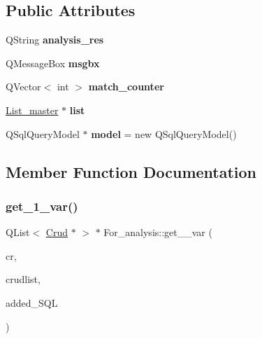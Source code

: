 \subsection*{Public Attributes}
\begin{DoxyCompactItemize}
\item 
\mbox{\label{class_for__analysis_a251957118880cf0a2da445c9b1b586e3}} 
Q\+String {\bfseries analysis\+\_\+res}
\item 
\mbox{\label{class_for__analysis_ad6c36fe176e7d0d0079389ae6e3615dd}} 
Q\+Message\+Box {\bfseries msgbx}
\item 
\mbox{\label{class_for__analysis_a4a22da8f47d58271e22b48810c03f26a}} 
Q\+Vector$<$ int $>$ {\bfseries match\+\_\+counter}
\item 
\mbox{\label{class_for__analysis_a440d3d6448090ff8959d7ed6d9183fc9}} 
\mbox{\hyperlink{class_list__master}{List\+\_\+master}} $\ast$ {\bfseries list}
\item 
\mbox{\label{class_for__analysis_a9967886f57b793af4a15ce2408813014}} 
Q\+Sql\+Query\+Model $\ast$ {\bfseries model} = new Q\+Sql\+Query\+Model()
\end{DoxyCompactItemize}


\subsection{Member Function Documentation}
\mbox{\label{class_for__analysis_a6cad406961034ae0ea3d87f42eef3ddd}} 
\subsubsection{\texorpdfstring{get\_1\_var()}{get\_1\_var()}}
{\footnotesize\ttfamily Q\+List$<$ \mbox{\hyperlink{class_crud}{Crud}} $\ast$ $>$ $\ast$ For\+\_\+analysis\+::get\+\_\+\_\+var (\begin{DoxyParamCaption}\item[{\mbox{\hyperlink{class_crud}{Crud}} $\ast$}]{cr,  }\item[{Q\+List$<$ \mbox{\hyperlink{class_crud}{Crud}} $\ast$ $>$ $\ast$}]{crudlist,  }\item[{Q\+String}]{added\+\_\+\+S\+QL }\end{DoxyParamCaption})}



